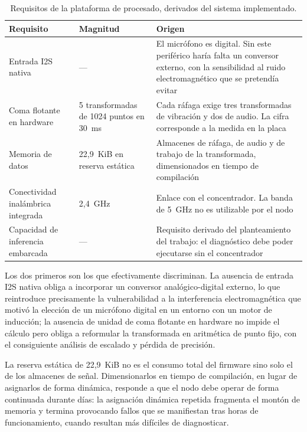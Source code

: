 \begin{table}[ht!]
\caption{Requisitos de la plataforma de procesado, derivados del sistema implementado.}
\label{table:requisitos}
\centering
\begin{tabular}{|p{4.1cm}|p{2.4cm}|p{5.7cm}|}
\hline
\textbf{Requisito} & \textbf{Magnitud} & \textbf{Origen} \\
\hline
Entrada I2S nativa & --- & El micrófono es digital. Sin este periférico haría falta un
conversor externo, con la sensibilidad al ruido electromagnético que se pretendía evitar \\
\hline
Coma flotante en hardware & 5 transformadas de 1024 puntos en \mbox{30 ms} & Cada ráfaga
exige tres transformadas de vibración y dos de audio. La cifra corresponde a la medida en
la placa \\
\hline
Memoria de datos & \mbox{22,9 KiB} en reserva estática & Almacenes de ráfaga, de audio y de
trabajo de la transformada, dimensionados en tiempo de compilación \\
\hline
Conectividad inalámbrica integrada & \mbox{2,4 GHz} & Enlace con el concentrador. La banda
de \mbox{5 GHz} no es utilizable por el nodo \\
\hline
Capacidad de inferencia embarcada & --- & Requisito derivado del planteamiento del trabajo:
el diagnóstico debe poder ejecutarse sin el concentrador \\
\hline
\end{tabular}
\end{table}

Los dos primeros son los que efectivamente discriminan. La ausencia de entrada I2S nativa obliga
a incorporar un conversor analógico-digital externo, lo que reintroduce precisamente la
vulnerabilidad a la interferencia electromagnética que motivó la elección de un micrófono digital
en un entorno con un motor de inducción; la ausencia de unidad de coma flotante en hardware no
impide el cálculo pero obliga a reformular la transformada en aritmética de punto fijo, con el
consiguiente análisis de escalado y pérdida de precisión.

La reserva estática de \mbox{22,9 KiB} no es el consumo total del firmware sino solo el de los
almacenes de señal. Dimensionarlos en tiempo de compilación, en lugar de asignarlos de forma
dinámica, responde a que el nodo debe operar de forma continuada durante días: la asignación
dinámica repetida fragmenta el montón de memoria y termina provocando fallos que se manifiestan
tras horas de funcionamiento, cuando resultan más difíciles de diagnosticar.

